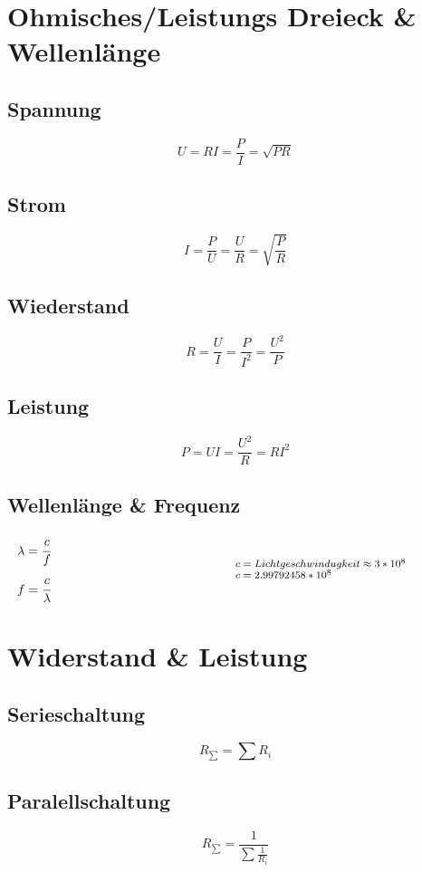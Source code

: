 \documentclass[12pt,a5paper,ngerman,titlepage]{article}
\begin{document}
\section{Ohmisches/Leistungs Dreieck \& Wellenlänge}
\subsection{Spannung}

$$U=RI =\frac{P}{I} = \sqrt{PR}$$

\subsection{Strom}
$$I=\frac{P}{U}=\frac{U}{R}=\sqrt{\frac{P}{R}} $$

\subsection{Wiederstand}
$$R=\frac{U}{I}=\frac{P}{I^2}=\frac{U^2}{P} $$

\subsection{Leistung}
$$P=UI =\frac{U^2}{R} =RI^2$$
\subsection{Wellenlänge \& Frequenz}
\[
\begin{minipage}{.5\linewidth}
  $\lambda=\cfrac{c}{f}$ \\[5pt]
  $f=\cfrac{c}{\lambda}$
\end{minipage}%
\begin{minipage}{.5\linewidth}
  \fontsize{8pt}{9pt}\selectfont
  $c = Lichtgeschwindugkeit \approx 3*10^{8}$ \\
  $c = 2.99792458*10^{8}$

\end{minipage}
\]
\newpage
\section{Widerstand \& Leistung}
\subsection{Serieschaltung}
$$R_{\sum} = \sum R_{i}$$

\subsection{Paralellschaltung}
$$R_{\sum} = \frac{1}{\sum \frac{1}{R_{i}}}$$
\end{document}
